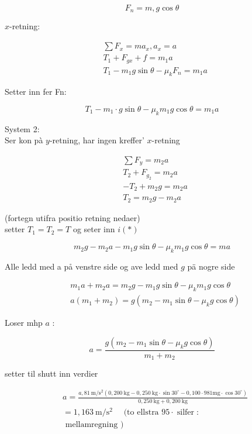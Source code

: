 \documentclass[10pt]{article}
\begin{document}
$$
F_{n}=m, g \cos \theta
$$

$x$-retning:

$$
\begin{aligned}
& \sum F_{x}=m a_{x}, a_{x}=a \\
& T_{1}+F_{g x}+f=m_{1} a \\
& T_{1}-m_{1} g \sin \theta-\mu_{k} F_{n}=m_{1} a
\end{aligned}
$$

Setter inn fer Fn:


\begin{equation*}
T_{1}-m_{1} \cdot g \sin \theta-\mu_{k} m_{1} g \cos \theta=m_{1} a \tag{*}
\end{equation*}


System 2:\\
Ser kon pà $y$-retning, har ingen kreffer' $x$-retning

$$
\begin{aligned}
& \sum F_{y}=m_{2} a \\
& T_{2}+F_{g_{2}}=m_{2} a \\
& -T_{2}+m_{2} g=m_{2} a \\
& T_{2}=m_{2} g-m_{2} a
\end{aligned}
$$

(fortegn utifra positio retning nedaer)\\
setter $T_{1}=T_{2}=T$ og seter inn $i(*)$

$$
m_{2} g-m_{2} a-m_{1} g \sin \theta-\mu_{k} m_{1} g \cos \theta=m a
$$

Alle ledd med a på venstre side og ave ledd med $g$ pä nogre side

$$
\begin{aligned}
& m_{1} a+m_{2} a=m_{2} g-m_{1} g \sin \theta-\mu_{k} m_{1} g \cos \theta \\
& a\left(m_{1}+m_{2}\right)=g\left(m_{2}-m_{1} \sin \theta-\mu_{k} g \cos \theta\right)
\end{aligned}
$$

Loser mhp $a$ :

$$
a=\frac{g\left(m_{2}-m_{1} \sin \theta-\mu_{k} g \cos \theta\right)}{m_{1}+m_{2}}
$$

setter til shutt inn verdier

$$
\begin{aligned}
& a=\frac{a, 81 \mathrm{~m} / \mathrm{s}^{2}\left(0,200 \mathrm{~kg}-0,250 \mathrm{~kg} \cdot \sin 30^{\circ}-0,100 \cdot 981 \mathrm{mg} \cdot \cos 30^{\circ}\right)}{0,250 \mathrm{~kg}+0,200 \mathrm{~kg}} \\
&=1,163 \mathrm{~m} / \mathrm{s}^{2} \quad \text { (to ellstra } 95 \cdot \operatorname{silfer}: \\
&\text { mellamregning })
\end{aligned}
$$
\end{document}

